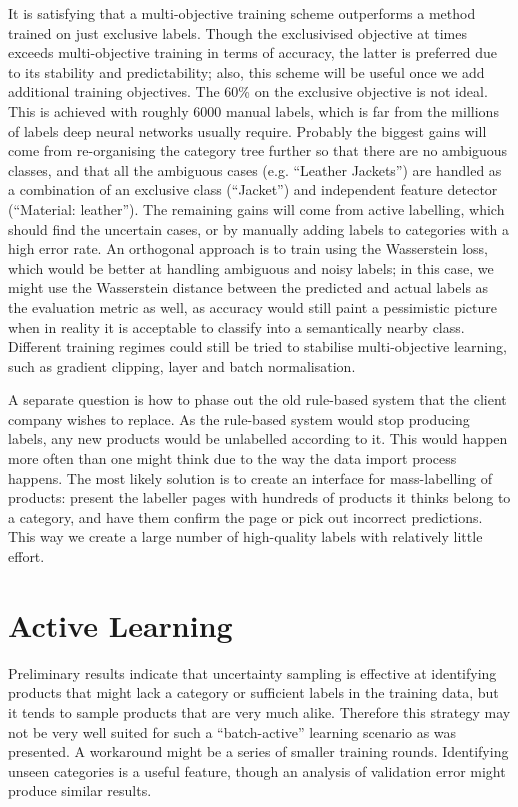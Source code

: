 It is satisfying that a multi-objective training scheme outperforms a method trained on just exclusive labels.
Though the exclusivised objective at times exceeds multi-objective training in terms of accuracy, the latter is preferred due to its stability and predictability; also, this scheme will be useful once we add additional training objectives.
The 60\% on the exclusive objective is not ideal.
This is achieved with roughly 6000 manual labels, which is far from the millions of labels deep neural networks usually require.
Probably the biggest gains will come from re-organising the category tree further so that there are no ambiguous classes, and that all the ambiguous cases (e.g. ``Leather Jackets'') are handled as a combination of an exclusive class (``Jacket'') and independent feature detector (``Material: leather'').
The remaining gains will come from active labelling, which should find the uncertain cases, or by manually adding labels to categories with a high error rate.
An orthogonal approach is to train using the Wasserstein loss, which would be better at handling ambiguous and noisy labels; in this case, we might use the Wasserstein distance between the predicted and actual labels as the evaluation metric as well, as accuracy would still paint a pessimistic picture when in reality it is acceptable to classify into a semantically nearby class.
Different training regimes could still be tried to stabilise multi-objective learning, such as gradient clipping, layer and batch normalisation.

A separate question is how to phase out the old rule-based system that the client company wishes to replace.
As the rule-based system would stop producing labels, any new products would be unlabelled according to it.
This would happen more often than one might think due to the way the data import process happens.
The most likely solution is to create an interface for mass-labelling of products: present the labeller pages with hundreds of products it thinks belong to a category, and have them confirm the page or pick out incorrect predictions.
This way we create a large number of high-quality labels with relatively little effort.

\section{Active Learning}

Preliminary results indicate that uncertainty sampling is effective at identifying products that might lack a category or sufficient labels in the training data, but it tends to sample products that are very much alike.
Therefore this strategy may not be very well suited for such a ``batch-active'' learning scenario as was presented.
A workaround might be a series of smaller training rounds.
Identifying unseen categories is a useful feature, though an analysis of validation error might produce similar results.
